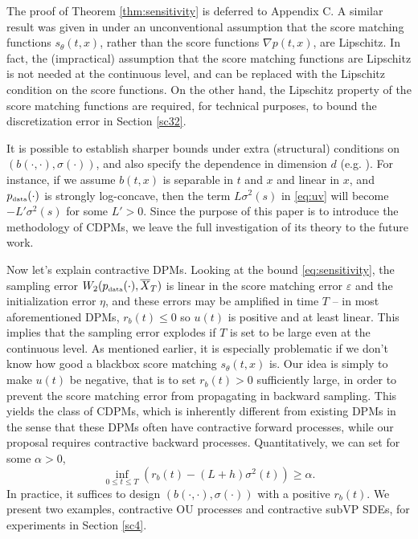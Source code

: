 \documentclass[letterpaper,11pt,reqno]{amsart}
\numberwithin{equation}{section}
\begin{document}
\quad The proof of Theorem \ref{thm:sensitivity} is deferred to Appendix C.
A similar result was given in \cite{KW22} 
under an unconventional assumption that
the score matching functions $s_\theta(t,x)$,
rather than the score functions $\nabla p(t,x)$,
are Lipschitz.
In fact,
the (impractical) assumption that 
the score matching functions are Lipschitz
is not needed at the continuous level,
and can be replaced with the Lipschitz condition on the score functions.
On the other hand,
the Lipschitz property of the score matching functions
are required, for technical purposes,
to bound the discretization error in Section \ref{sc32}.

\quad It is possible to establish sharper bounds under extra (structural) conditions on $(b(\cdot, \cdot), \sigma(\cdot))$, 
and also specify the dependence in dimension $d$ (e.g. \cite{Chen23, GNZ23}).
For instance, if we assume $b(t,x)$ is separable in $t$ and $x$ and linear in $x$,
and $p_{\tiny \mbox{data}}(\cdot)$ is strongly log-concave,
then the term $L \sigma^2(s)$ in \eqref{eq:uv} will become $-L' \sigma^2(s)$ for some $L' > 0$.
Since the purpose of this paper is to introduce the methodology of CDPMs, 
we leave the full investigation of its theory to the future work.

\quad Now let's explain contractive DPMs. 
Looking at the bound \eqref{eq:sensitivity}, 
the sampling error $W_2(p_{\tiny \mbox{data}}(\cdot), \overline{X}_T)$
is linear in the score matching error $\varepsilon$
and the initialization error $\eta$,
and these errors may be amplified in time $T$
-- in most aforementioned DPMs, 
$r_b(t) \le 0$ so $u(t)$ is positive and at least linear.
This implies that the sampling error explodes if $T$ is set to be large
even at the continuous level. 
As mentioned earlier,
it is especially problematic 
if we don't know how good a blackbox score matching $s_\theta(t,x)$ is.
Our idea is simply
 to make $u(t)$ be negative, that is to set $r_b(t) > 0$ sufficiently large, 
in order to prevent the score matching error from propagating in backward sampling.
This yields the class of CDPMs,
which is inherently different from existing DPMs in the sense that
these DPMs often have contractive forward processes,
while our proposal requires contractive backward processes.
Quantitatively, we can set for some $\alpha > 0$,
\begin{equation}
\label{eq:contra1}
\inf_{0 \le t \le T} \left(r_b(t) - (L + h) \sigma^2(t) \right) \ge \alpha.
\end{equation} 
In practice, it suffices to design $(b(\cdot, \cdot), \sigma(\cdot))$ with a positive $r_b(t)$.
We present two examples, contractive OU processes and contractive subVP SDEs,
for experiments in Section \ref{sc4}.
\end{document}
